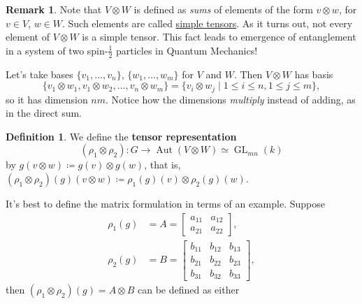 \documentclass[12pt]{article}
\newcommand{\ita}[1]{\textit{#1}}
\theoremstyle{definition}
\newtheorem{definition}[theorem]{Definition}
\newtheorem*{remark}{Remark}
\DeclareMathOperator\Aut{Aut}
\DeclareMathOperator\GL{GL}
\begin{document}
\begin{enumerate}
    \begin{remark}
        Note that $V\otimes W$ is defined as \ita{sums} of elements of the form $v\otimes w$, for $v\in V$, $w\in W$. Such elements are called \underline{simple tensors}. As it turns out, not every element of $V\otimes W$ is a simple tensor. This fact leads to emergence of entanglement in a system of two spin-$\frac{1}{2}$ particles in Quantum Mechanics!
    \end{remark}
    Let's take bases $\{v_1,\dotsc,v_n\}$, $\{w_1,\dotsc,w_m\}$ for $V$ and $W$. Then $V\otimes W$ has basis 
    \begin{equation}
        \{v_1\otimes w_1,v_1\otimes w_2,\dotsc,v_n\otimes w_m\}=\{v_i\otimes w_j\mid 1\leq i\leq n,1\leq j\leq m\},
    \end{equation}
    so it has dimension $nm$. Notice how the dimensions \ita{multiply} instead of adding, as in the direct sum.
    \begin{definition}
        We define the \textbf{tensor representation}
        \begin{equation}
            (\rho_1\otimes\rho_2):G\to\Aut(V\otimes W)\simeq\GL_{mn}(k)
        \end{equation}
        by $g(v\otimes w)\coloneqq g(v)\otimes g(w)$, that is, $(\rho_1\otimes\rho_2)(g)(v\otimes w)\coloneqq \rho_1(g)(v)\otimes\rho_2(g)(w)$.
    \end{definition}
    It's best to define the matrix formulation in terms of an example. Suppose 
    \begin{equation}
        \begin{split}
            \rho_1(g)&=A=
            \begin{bmatrix}
                a_{11} & a_{12} \\[0.3em]
                a_{21} & a_{22}
            \end{bmatrix},\\
            \rho_2(g)&=B=
            \begin{bmatrix}
                b_{11} & b_{12} & b_{13} \\[0.3em]
                b_{21} & b_{22} & b_{23} \\[0.3em]
                b_{31} & b_{32} & b_{33}
            \end{bmatrix},
        \end{split}
    \end{equation}
    then $(\rho_1\otimes\rho_2)(g)=A\otimes B$ can be defined as either 
    \begin{equation}

\end{equation}
\end{enumerate}
\end{document}
